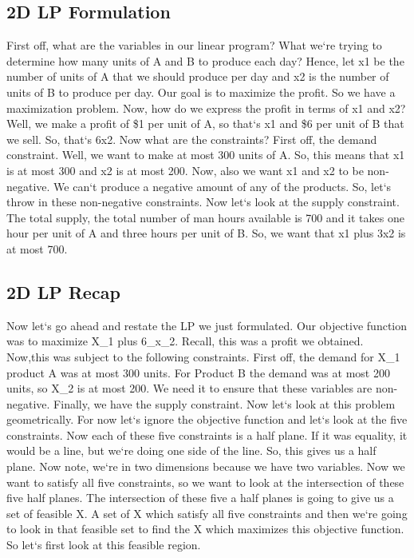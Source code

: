 \subsection{2D LP Formulation}
First off, what are the variables in our linear program? What we`re trying to determine how many units of A and B to produce each day? Hence, let x1 be the number of units of A that we should produce per day and x2 is the number of units of B to produce per day.
Our goal is to maximize the profit.
So we have a maximization problem.
Now, how do we express the profit in terms of x1 and x2? Well, we make a profit of \$1 per unit of A, so that`s x1 and \$6 per unit of B that we sell.
So, that`s 6x2.
Now what are the constraints? First off, the demand constraint.
Well, we want to make at most 300 units of A\@.
So, this means that x1 is at most 300 and x2 is at most 200.
Now, also we want x1 and x2 to be non-negative.
We can`t produce a negative amount of any of the products.
So, let`s throw in these non-negative constraints.
Now let`s look at the supply constraint.
The total supply, the total number of man hours available is 700 and it takes one hour per unit of A and three hours per unit of B\@.
So, we want that x1 plus 3x2 is at most 700.

\subsection{2D LP Recap}
Now let`s go ahead and restate the LP we just formulated.
Our objective function was to maximize X\_1 plus 6\_x\_2.
Recall, this was a profit we obtained.
Now,this was subject to the following constraints.
First off, the demand for X\_1 product A was at most 300 units.
For Product B the demand was at most 200 units, so X\_2 is at most 200.
We need it to ensure that these variables are non-negative.
Finally, we have the supply constraint.
Now let`s look at this problem geometrically.
For now let`s ignore the objective function and let`s look at the five constraints.
Now each of these five constraints is a half plane.
If it was equality, it would be a line, but we`re doing one side of the line.
So, this gives us a half plane.
Now note, we`re in two dimensions because we have two variables.
Now we want to satisfy all five constraints, so we want to look at the intersection of these five half planes.
The intersection of these five a half planes is going to give us a set of feasible X\@.
A set of X which satisfy all five constraints and then we`re going to look in that feasible set to find the X which maximizes this objective function.
So let`s first look at this feasible region.

